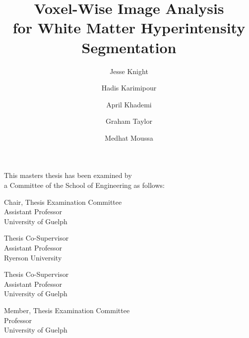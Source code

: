 \title{Voxel-Wise Image Analysis\\for White Matter Hyperintensity Segmentation}
\author{Jesse Knight}
\degreemonth{}
\copyrightnoticetext{}
\maketitle
\cleardoublepage{}
\setcounter{page}{1}
\begin{abstractpage}

\end{abstractpage}
\cleardoublepage{}
\begin{titlepage}
  \begin{large}
    This masters thesis has been examined by \\ a Committee of the School of Engineering as follows:
    \signature{Hadis Karimipour}{Chair, Thesis Examination Committee \\
      Assistant Professor\\
      University of Guelph}
    \signature{April Khademi}{Thesis Co-Supervisor \\
      Assistant Professor\\
      Ryerson University}
    \signature{Graham Taylor}{Thesis Co-Supervisor \\
      Assistant Professor\\
      University of Guelph}
    \signature{Medhat Moussa}{Member, Thesis Examination Committee \\
      Professor\\
      University of Guelph}
  \end{large}
\end{titlepage}
